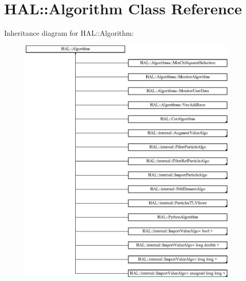 \hypertarget{class_h_a_l_1_1_algorithm}{\section{H\+A\+L\+:\+:Algorithm Class Reference}
\label{class_h_a_l_1_1_algorithm}
}
Inheritance diagram for H\+A\+L\+:\+:Algorithm\+:\begin{figure}[H]
\begin{center}
\leavevmode
\includegraphics[height=12.000000cm]{class_h_a_l_1_1_algorithm}
\end{center}
\end{figure}
